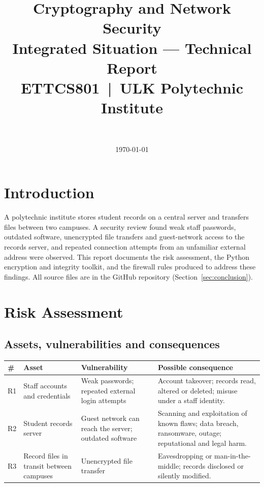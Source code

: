 \documentclass[11pt,a4paper]{article}
\title{Cryptography and Network Security\\ \large Integrated Situation --- Technical Report\\
       \normalsize ETTCS801 \,|\, ULK Polytechnic Institute}
\author{\todo{Your full name} \\ \todo{Registration number}}
\date{\today}
\begin{document}
\maketitle
\tableofcontents
\bigskip

\section{Introduction}
A polytechnic institute stores student records on a central server and transfers files between two campuses.
A security review found weak staff passwords, outdated software, unencrypted file transfers and guest-network
access to the records server, and repeated connection attempts from an unfamiliar external address were observed.
This report documents the risk assessment, the Python encryption and integrity toolkit, and the firewall
rules produced to address these findings. All source files are in the GitHub repository (Section~\ref{sec:conclusion}).

\section{Risk Assessment}
\subsection{Assets, vulnerabilities and consequences}
\begin{longtable}{@{}p{0.3cm}p{3.3cm}p{4.2cm}p{6.3cm}@{}}
\toprule
\# & Asset & Vulnerability & Possible consequence\\ \midrule\endhead
R1 & Staff accounts and credentials & Weak passwords; repeated external login attempts &
Account takeover; records read, altered or deleted; misuse under a staff identity.\\[4pt]
R2 & Student records server & Guest network can reach the server; outdated software &
Scanning and exploitation of known flaws; data breach, ransomware, outage; reputational and legal harm.\\[4pt]
R3 & Record files in transit between campuses & Unencrypted file transfer &
Eavesdropping or man-in-the-middle; records disclosed or silently modified.\\
\bottomrule
\end{longtable}
\end{document}
